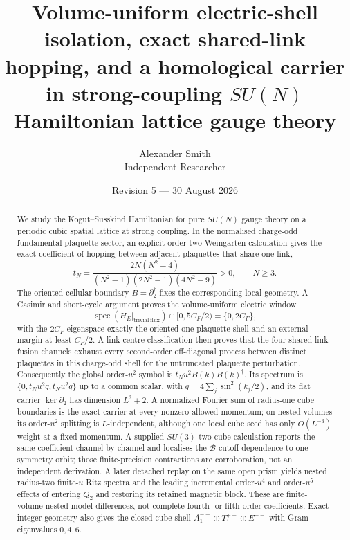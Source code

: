 \documentclass[11pt]{article}
\theoremstyle{plain}
\theoremstyle{definition}
\theoremstyle{remark}
\newcommand{\dg}{^{\dagger}}
\begin{document}
\title{\bfseries Volume-uniform electric-shell isolation, exact shared-link
hopping, and a homological carrier\\
in strong-coupling $SU(N)$ Hamiltonian lattice gauge theory}
\author{Alexander Smith\\ \small Independent Researcher}
\date{Revision 5 --- 30 August 2026}
\maketitle

\begin{abstract}
\noindent
We study the Kogut--Susskind Hamiltonian for pure $SU(N)$ gauge theory on a
periodic cubic spatial lattice at strong coupling. In the normalised
charge-odd fundamental-plaquette sector, an explicit order-two Weingarten
calculation gives the exact coefficient of hopping between adjacent
plaquettes that share one link,
\[
  t_N=\frac{2N(N^2-4)}{(N^2-1)(2N^2-1)(4N^2-9)}>0,\qquad N\ge 3 .
\]
The oriented cellular boundary $B=\partial_2\dg$ fixes the corresponding local
geometry. A Casimir and short-cycle argument proves the volume-uniform electric
window
\[
 \operatorname{spec}(H_E|_{\mathrm{trivial\ flux}})
 \cap[0,5C_F/2)=\{0,2C_F\},
\]
with the $2C_F$ eigenspace exactly the oriented one-plaquette shell and an
external margin at least $C_F/2$. A link-centre classification then proves that
the four shared-link fusion channels exhaust every second-order off-diagonal
process between distinct plaquettes in this charge-odd shell for the
untruncated plaquette perturbation. Consequently
the global order-$u^2$ symbol is $t_Nu^2B(k)B(k)\dg$. Its spectrum is
$\{0,t_Nu^2q,t_Nu^2q\}$ up to a common scalar, with
$q=4\sum_j\sin^2(k_j/2)$, and its flat carrier
$\ker\partial_2$ has dimension $L^3+2$. A normalized Fourier sum of radius-one
cube boundaries is the exact carrier at every nonzero allowed momentum; on
nested volumes its order-$u^2$ splitting is $L$-independent, although one local
cube seed has only $O(L^{-3})$ weight at a fixed momentum. A supplied $SU(3)$ two-cube
calculation reports the same coefficient channel by channel and localises the
$\mathcal B$-cutoff dependence to one symmetry orbit; those finite-precision
contractions are corroboration, not an independent derivation. A later
detached replay on the same open prism yields nested radius-two finite-$u$
Ritz spectra and the leading incremental order-$u^4$ and order-$u^5$ effects
of entering $Q_2$ and restoring its retained magnetic block. These are
finite-volume nested-model differences, not complete fourth- or fifth-order
coefficients. Exact integer geometry also
gives the closed-cube shell
$A_1^{--}\oplus T_1^{+-}\oplus E^{--}$ with Gram eigenvalues $0,4,6$.


\end{abstract}
\end{document}
